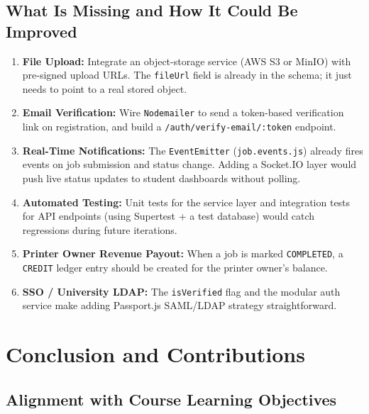 \documentclass[12pt,a4paper]{report}
\begin{document}
\section{What Is Missing and How It Could Be Improved}

\begin{enumerate}[leftmargin=2em]
  \item \textbf{File Upload:} Integrate an object-storage service (AWS S3 or MinIO) with
    pre-signed upload URLs. The \texttt{fileUrl} field is already in the schema; it just
    needs to point to a real stored object.
  \item \textbf{Email Verification:} Wire \texttt{Nodemailer} to send a token-based
    verification link on registration, and build a \texttt{/auth/verify-email/:token}
    endpoint.
  \item \textbf{Real-Time Notifications:} The \texttt{EventEmitter} (\texttt{job.events.js})
    already fires events on job submission and status change. Adding a Socket.IO layer would
    push live status updates to student dashboards without polling.
  \item \textbf{Automated Testing:} Unit tests for the service layer and integration tests
    for API endpoints (using Supertest + a test database) would catch regressions during
    future iterations.
  \item \textbf{Printer Owner Revenue Payout:} When a job is marked \texttt{COMPLETED}, a
    \texttt{CREDIT} ledger entry should be created for the printer owner's balance.
  \item \textbf{SSO / University LDAP:} The \texttt{isVerified} flag and the modular auth
    service make adding Passport.js SAML/LDAP strategy straightforward.
\end{enumerate}

\clearpage

\chapter{Conclusion and Contributions}

\section{Alignment with Course Learning Objectives}
\end{document}

